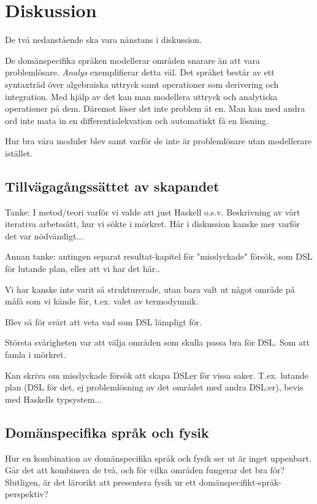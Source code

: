 
\chapter{Diskussion}

\begin{binge}
De två nedanstående ska vara nånstans i diskussion.

De domänspecifika språken modellerar områden snarare än att vara problemlösare. \textit{Analys} exemplifierar detta väl. Det språket består av ett syntaxträd över algebraiska uttryck samt operationer som derivering och integration. Med hjälp av det kan man modellera uttryck och analytiska operationer på dem. Däremot löser det inte problem åt en. Man kan med andra ord inte mata in en differentialekvation och automatiskt få en lösning.

Hur bra våra moduler blev samt varför de inte är problemlösare utan modellerare istället.

\section{Tillvägagångssättet av skapandet}

Tanke: I metod/teori varför vi valde att just Haskell o.s.v. Beskrivning av
vårt iterativa arbetssätt, hur vi sökte i mörkret. Här i diskussion kanske mer
varför det var nödvändigt...

Annan tanke: antingen separat resultat-kapitel för "misslyckade" försök, som
DSL för lutande plan, eller att vi har det här..

Vi har kanske inte varit så strukturerade, utan bara valt ut något område på
måfå som vi kände för, t.ex. valet av termodynmik.

Blev så för svårt att veta vad som DSL lämpligt för.

Största svårigheten var att välja områden som skulla passa bra för DSL. Som att
famla i mörkret.

Kan skriva om misslyckade försök att skapa DSLer för vissa saker. T.ex. lutande plan (DSL för det, ej problemlösning av det området med andra DSL:er), bevis med Haskells typsystem...

\section{Domänspecifika språk och fysik}

Hur en kombination av domänspecifika språk och fysik ser ut är inget uppenbart. Går det att kombinera de två, och för vilka områden fungerar det bra för? Slutligen, är det lärorikt att presentera fysik ur ett domänspecifikt-språk-perspektiv?


\end{binge}
